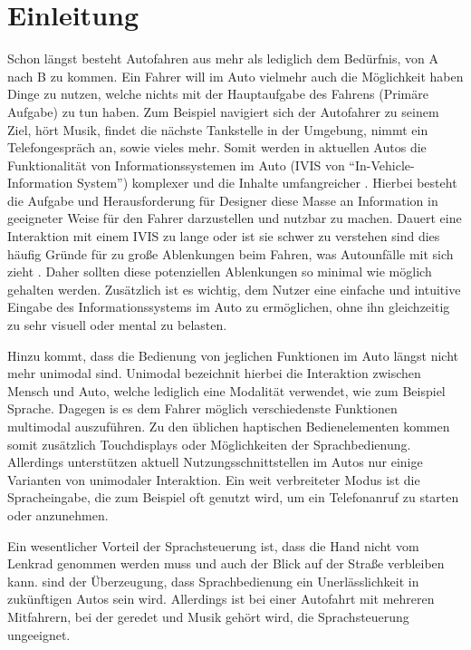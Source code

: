 \chapter{Einleitung}
Schon längst besteht Autofahren aus mehr als lediglich dem Bedürfnis, von A nach B zu kommen.
Ein Fahrer will im Auto vielmehr auch die Möglichkeit haben Dinge zu nutzen, welche nichts mit der Hauptaufgabe des Fahrens (Primäre Aufgabe) zu tun haben.
Zum Beispiel navigiert sich der Autofahrer zu seinem Ziel, hört Musik, findet die nächste Tankstelle in der Umgebung, nimmt ein Telefongespräch an, sowie vieles mehr.
Somit werden in aktuellen Autos die Funktionalität von Informationssystemen im Auto (IVIS von "`In-Vehicle-Information System"') komplexer und die Inhalte umfangreicher \citep{Kern:2009}.
Hierbei besteht die Aufgabe und Herausforderung für Designer diese Masse an Information in geeigneter Weise für den Fahrer darzustellen und nutzbar zu machen.
Dauert eine Interaktion mit einem IVIS zu lange oder ist sie schwer zu verstehen sind dies häufig Gründe für zu große Ablenkungen beim Fahren, was Autounfälle mit sich zieht \citep{neale2005overview}.
Daher sollten diese potenziellen Ablenkungen so minimal wie möglich gehalten werden.
Zusätzlich ist es wichtig, dem Nutzer eine einfache und intuitive Eingabe des Informationssystems im Auto zu ermöglichen, ohne ihn gleichzeitig zu sehr visuell oder mental zu belasten. 

Hinzu kommt, dass die Bedienung von jeglichen Funktionen im Auto längst nicht mehr unimodal sind.
Unimodal bezeichnit hierbei die Interaktion zwischen Mensch und Auto, welche lediglich eine Modalität verwendet, wie zum Beispiel Sprache.
Dagegen is es dem Fahrer möglich verschiedenste Funktionen multimodal auszuführen.
Zu den üblichen haptischen Bedienelementen kommen somit zusätzlich Touchdisplays oder Möglichkeiten der Sprachbedienung. 
Allerdings unterstützen aktuell Nutzungsschnittstellen im Autos nur einige Varianten von unimodaler Interaktion. 
Ein weit verbreiteter Modus ist die Spracheingabe, die zum Beispiel oft genutzt wird, um ein Telefonanruf zu starten oder anzunehmen. 

Ein wesentlicher Vorteil der Sprachsteuerung ist, dass die Hand nicht vom Lenkrad genommen werden muss und auch der Blick auf der Straße verbleiben kann.
\citet{maciej2009comparison} sind der Überzeugung, dass Sprachbedienung ein Unerlässlichkeit in zukünftigen Autos sein wird.
Allerdings ist bei einer Autofahrt mit mehreren Mitfahrern, bei der geredet und Musik gehört wird, die Sprachsteuerung ungeeignet. 

